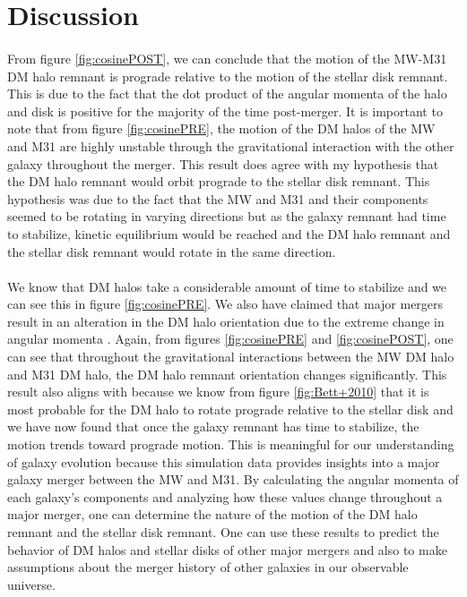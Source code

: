 \documentclass[fleqn,usenatbib]{mnras}
\begin{document}
\section{Discussion}

\paragraph{} From figure \ref{fig:cosinePOST}, we can conclude that the motion of the MW-M31 DM halo remnant is prograde relative to the motion of the stellar disk remnant. This is due to the fact that the dot product of the angular momenta of the halo and disk is positive for the majority of the time post-merger. It is important to note that from figure \ref{fig:cosinePRE}, the motion of the DM halos of the MW and M31 are highly unstable through the gravitational interaction with the other galaxy throughout the merger. This result does agree with my hypothesis that the DM halo remnant would orbit prograde to the stellar disk remnant. This hypothesis was due to the fact that the MW and M31 and their components seemed to be rotating in varying directions but as the galaxy remnant had time to stabilize, kinetic equilibrium would be reached and the DM halo remnant and the stellar disk remnant would rotate in the same direction.

\paragraph{} We know that DM halos take a considerable amount of time to stabilize \citep{Drakos+2019} and we can see this in figure \ref{fig:cosinePRE}. We also have claimed that major mergers result in an alteration in the DM halo orientation due to the extreme change in angular momenta \citep{Baptista+2023}. Again, from figures \ref{fig:cosinePRE} and \ref{fig:cosinePOST}, one can see that throughout the gravitational interactions between the MW DM halo and M31 DM halo, the DM halo remnant orientation changes significantly. This result also aligns with \citep{Bett+2010} because we know from figure \ref{fig:Bett+2010} that it is most probable for the DM halo to rotate prograde relative to the stellar disk and we have now found that once the galaxy remnant has time to stabilize, the motion trends toward prograde motion. This is meaningful for our understanding of galaxy evolution because this simulation data provides insights into a major galaxy merger between the MW and M31. By calculating the angular momenta of each galaxy's components and analyzing how these values change throughout a major merger, one can determine the nature of the motion of the DM halo remnant and the stellar disk remnant. One can use these results to predict the behavior of DM halos and stellar disks of other major mergers and also to make assumptions about the merger history of other galaxies in our observable universe. 
\end{document}
